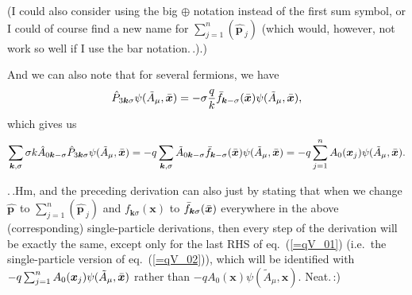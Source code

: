 \documentclass{report}
\begin{document}
(I could also consider using the big $\oplus$ notation instead of the first sum symbol, or I could of course find a new name for $\sum_{j=1}^n ({\hat{\boldsymbol p\,}\!}_j)$ (which would, however, not work so well if I use the bar notation.\,.).)

And we can also note that for several fermions, we have
\begin{align}
\begin{aligned}
	\hat P_{3 \boldsymbol k \sigma} 
	\psi(\tilde A_\mu, \bar{\boldsymbol{x}\hspace{.05em}}\hspace{-.05em}) = 
		-\sigma\frac{q}{k}
		\bar f_{\boldsymbol{k} -\sigma}(\bar{\boldsymbol{x}\hspace{.05em}}\hspace{-.05em}) 
		\psi(\tilde A_\mu, \bar{\boldsymbol{x}\hspace{.05em}}\hspace{-.05em}),
\end{aligned}
\end{align}
which gives us
\begin{align}
\begin{aligned}
	\sum_{\boldsymbol k, \sigma} 
		\sigma k \hat{A}_{0 \boldsymbol k -\sigma} 
		\hat P_{3 \boldsymbol k \sigma} 
		\psi(\tilde A_\mu, \bar{\boldsymbol{x}\hspace{.05em}}\hspace{-.05em}) 
	= 
	-q\sum_{\boldsymbol k, \sigma}
		\tilde A_{0 \boldsymbol k -\sigma} 
		\bar f_{\boldsymbol{k} -\sigma}(\bar{\boldsymbol{x}\hspace{.05em}}\hspace{-.05em}) 
		\psi(\tilde A_\mu, \bar{\boldsymbol{x}\hspace{.05em}}\hspace{-.05em})
	= 
	-q \sum_{j=1}^n A_0(\boldsymbol{x}_j) 
	\psi(\tilde A_\mu, \bar{\boldsymbol{x}\hspace{.05em}}\hspace{-.05em}).
	\label{=qV_02}
\end{aligned}
\end{align}

.\,.Hm, and the preceding derivation can also just by stating that when we change $\hat{\boldsymbol p\,}\!$ to $\sum_{j=1}^n ({\hat{\boldsymbol p\,}\!}_j)$ and $f_{\boldsymbol{k}\sigma}(\boldsymbol{x})$ to $\bar f_{\boldsymbol{k} \sigma}(\bar{\boldsymbol{x}\hspace{.05em}}\hspace{-.05em})$ everywhere in the above (corresponding) single-particle derivations, then every step of the derivation will be exactly the same, except only for the last RHS of eq.\ (\ref{=qV_01}) (i.e.\ the single-particle version of eq.\ (\ref{=qV_02})), which will be identified with 
$-q \sum_{j=1}^n A_0(\boldsymbol{x}_j) 
\psi(\tilde A_\mu, \bar{\boldsymbol{x}\hspace{.05em}}\hspace{-.05em})$ rather than 
$-q A_0(\boldsymbol{x}) \psi(\tilde A_\mu, \boldsymbol{x})$. Neat.\,:) %
\end{document}
